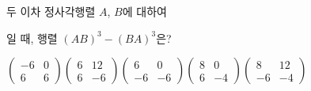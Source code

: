 두 이차 정사각행렬 $A$, $B$에 대하여 \par\smallskip{}\par\smallskip\noindent 일 때, 행렬 $(AB)^3-(BA)^3$은?
\begin{choicesii}{$\begin{pmatrix} -6 & 0 \\ 6 & 6 \end{pmatrix}$}{$\begin{pmatrix} 6 & 12 \\ 6 & -6 \end{pmatrix}$}{$\begin{pmatrix} 6 & 0 \\ -6 & -6 \end{pmatrix}$}{$\begin{pmatrix} 8 & 0 \\ 6 & -4 \end{pmatrix}$}{$\begin{pmatrix} 8 & 12 \\ -6 & -4 \end{pmatrix}$}\end{choicesii}
